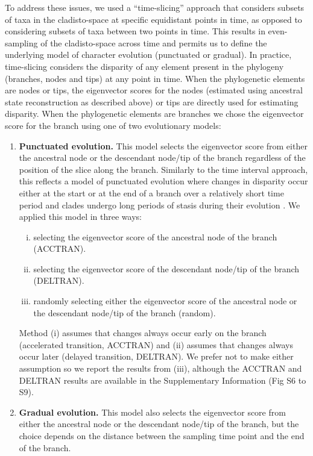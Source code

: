 \documentclass[10pt,letterpaper]{article}
\begin{document}
To address these issues, we used a ``time-slicing'' approach that considers subsets of taxa in the cladisto-space at specific equidistant points in time, as opposed to considering subsets of taxa between two points in time.
This results in even-sampling of the cladisto-space across time and permits us to define the underlying model of character evolution (punctuated or gradual).  
In practice, time-slicing considers the disparity of any element present in the phylogeny (branches, nodes and tips) at any point in time.
When the phylogenetic elements are nodes or tips, the eigenvector scores for the nodes (estimated using ancestral state reconstruction as described above) or tips are directly used for estimating disparity.
When the phylogenetic elements are branches we chose the eigenvector score for the branch using one of two evolutionary models:
\begin{enumerate}
    \item{\textbf{Punctuated evolution.}} 
    This model selects the eigenvector score from either the ancestral node or the descendant node/tip of the branch regardless of the position of the slice along the branch. 
    Similarly to the time interval approach, this reflects a model of punctuated evolution where changes in disparity occur either at the start or at the end of a branch over a relatively short time period and clades undergo long periods of stasis during their evolution \citep{Gould1977,Hunt20112007}.
    We applied this model in three ways: 
    \begin{enumerate}[(i)]
      \item selecting the eigenvector score of the ancestral node of the branch (ACCTRAN).
      \item selecting the eigenvector score of the descendant node/tip of the branch (DELTRAN).
      \item randomly selecting either the eigenvector score of the ancestral node or the descendant node/tip of the branch (random).
    \end{enumerate}
    Method (i) assumes that changes always occur early on the branch (accelerated transition, ACCTRAN) and (ii) assumes that changes always occur later (delayed transition, DELTRAN).
    We prefer not to make either assumption so we report the results from (iii), although the ACCTRAN and DELTRAN results are available in the Supplementary Information (Fig S6 to S9).
    \item{\textbf{Gradual evolution.}}
    This model also selects the eigenvector score from either the ancestral node or the descendant node/tip of the branch, but the choice depends on the distance between the sampling time point and the end of the branch.

\end{enumerate}
\end{document}
